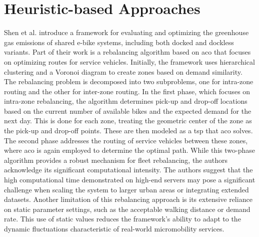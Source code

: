 \section{Heuristic-based Approaches}\label{sec:related-work_heuristics}
Shen et al. \cite{shen_enhancing_2024} introduce a framework for evaluating and optimizing the greenhouse gas emissions of shared e-bike systems, including both docked and dockless variants. 
Part of their work is a rebalancing algorithm based on \gls{aco} that focuses on optimizing routes for service vehicles. 
Initially, the framework uses hierarchical clustering and a Voronoi diagram to create zones based on demand similarity. 
The rebalancing problem is decomposed into two subproblems, one for intra-zone routing and the other for inter-zone routing. 
In the first phase, which focuses on intra-zone rebalancing, the algorithm determines pick-up and drop-off locations based on the current number of available bikes and the expected demand for the next day.
This is done for each zone, treating the geometric center of the zone as the pick-up and drop-off points.
These are then modeled as a \gls{tsp} that \gls{aco} solves. 
The second phase addresses the routing of service vehicles between these zones, where \gls{aco} is again employed to determine the optimal path.
While this two-phase algorithm provides a robust mechanism for fleet rebalancing, the authors acknowledge its significant computational intensity.
The authors suggest that the high computational time demonstrated on high-end servers may pose a significant challenge when scaling the system to larger urban areas or integrating extended datasets.
Another limitation of this rebalancing approach is its extensive reliance on static parameter settings, such as the acceptable walking distance or demand rate.
This use of static values reduces the framework's ability to adapt to the dynamic fluctuations characteristic of real-world micromobility services.
\\

